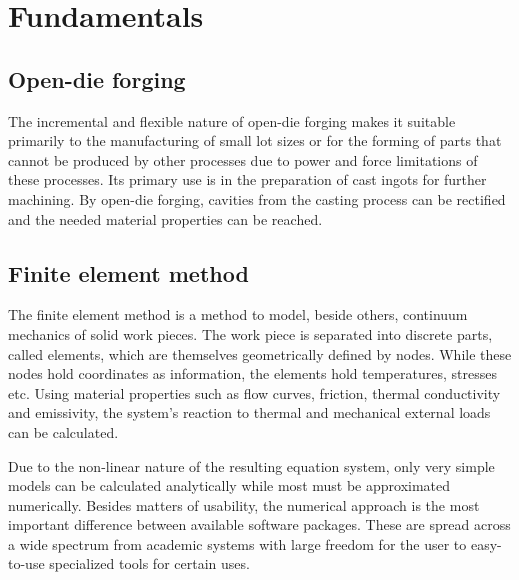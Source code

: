 \section{Fundamentals}

\subsection{Open-die forging}
The incremental and flexible nature of open-die forging makes it suitable primarily to the manufacturing of small lot sizes or for the forming of parts that cannot be produced by other processes due to power and force limitations of these processes. Its primary use is in the preparation of cast ingots for further machining. By open-die forging, cavities from the casting process can be rectified and the needed material properties can be reached.\cite{forgcomp}

\subsection{Finite element method}
The finite element method is a method to model, beside others, continuum mechanics of solid work pieces. The work piece is separated into discrete parts, called elements, which are themselves geometrically defined by nodes. While these nodes hold coordinates as information, the elements hold temperatures, stresses etc. Using material properties such as flow curves, friction, thermal conductivity and emissivity, the system's reaction to thermal and mechanical external loads can be calculated.

Due to the non-linear nature of the resulting equation system, only very simple models can be calculated analytically while most must be approximated numerically. Besides matters of usability, the numerical approach is the most important difference between available software packages. These are spread across a wide spectrum from academic systems with large freedom for the user to easy-to-use specialized tools for certain uses.
